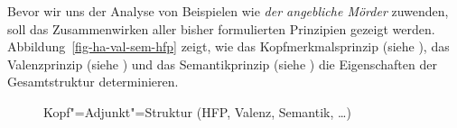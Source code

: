 Bevor wir uns der Analyse von Beispielen wie \emph{der angebliche Mörder} zuwenden,
soll das Zusammenwirken aller bisher formulierten Prinzipien gezeigt werden.
Abbildung~\vref{fig-ha-val-sem-hfp} zeigt, wie das Kopfmerkmalsprinzip (siehe ),
das Valenzprinzip (siehe ) und
das Semantikprinzip (siehe ) die
Eigenschaften der Gesamtstruktur determinieren.
\begin{figure}[htbp]
\hspace{2em}\resizebox{0.96\textwidth}{!}{%
\begin{tabular}[t]{@{}c@{\hspace{10mm}}c@{}}%
\multicolumn{2}{c}{\rnode{1}{\nbar[\begin{tabular}[t]{@{}l}
  \textsc{head}   \rnode{h1}{\ibox{1}},\\
  \textsc{subcat} \rnode{sc1}{\ibox{2}},\\
  \rnode{cont1}{\textsc{cont}}   \ibox{3}]\\
  \end{tabular}}
}\\
\\*[4ex]
\rnode{2}{AP[\begin{tabular}[t]{@{}l}
  \textsc{head$|$mod} \ibox{4},\\
  \rnode{cont2}{\textsc{cont}}   \ibox{3} [\textsc{restr} \sliste{ \textrm{\relation{interessant}\iboxb{5}} } $\oplus$ \ibox{6}]]\\
  \end{tabular}} & \rnode{3}{\ibox{4} \nbar[\begin{tabular}[t]{@{}l}
                                      \textsc{head}   \rnode{h2}{\ibox{1}},\\
                                      \textsc{subcat} \rnode{sc2}{\ibox{2}} \sliste{ Det },\\
                                      \textsc{cont$|$restr} \ibox{6} \sliste{ \textrm{\relation{buch}\iboxb{5}} }]
                                                         \end{tabular}
                                                       }\\
\\[4ex]
\rnode{4}{interessantes}                     & \rnode{5}{Buch}\\
\end{tabular}
\ncline{1}{2}\ncline{1}{3}%
\ncline{2}{4}\ncline{3}{5}%
\ncline{<->}[r]{h1}[tr]{h2}{1.5cm}%
\ncline{<->}[r]{sc1}[tr]{sc2}{1.5cm}%
\ncline{<->}[l]{cont1}[l]{cont2}{3.5cm}%
}
\caption{\label{fig-ha-val-sem-hfp}Kopf"=Adjunkt"=Struktur (HFP, Valenz, Semantik, \ldots)}
\end{figure}





